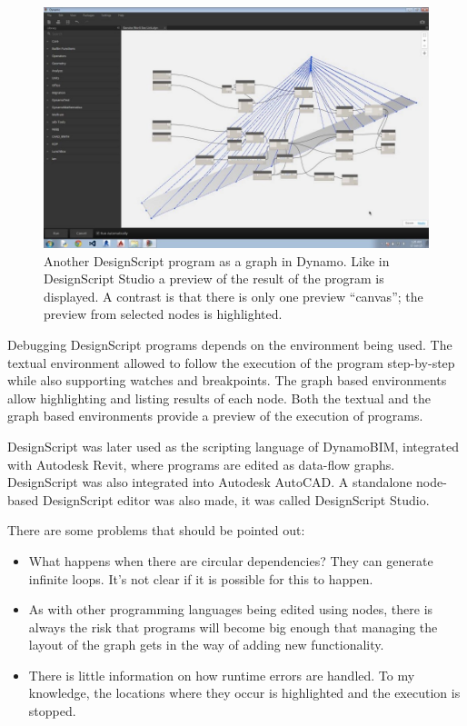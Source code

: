 \documentclass{./llncs2e/llncs}
\begin{document}
	\begin{figure}
		\centering
		\includegraphics[width=1.0\textwidth]{img/ds_dynamo}
		\caption{Another DesignScript program as a graph in Dynamo. Like in DesignScript Studio a preview of the result of the program is displayed. A contrast is that there is only one preview ``canvas''; the preview from selected nodes is highlighted.}
		\label{fig:ds:dynamo}
	\end{figure} 
	
	Debugging DesignScript programs depends on the environment being used. 
	The textual environment allowed to follow the execution of the program step-by-step while also supporting watches and breakpoints. 
	The graph based environments allow highlighting and listing results of each node. 
	Both the textual and the graph based environments provide a preview of the execution of programs.
	
	
	DesignScript was later used as the scripting language of DynamoBIM, integrated with Autodesk Revit, where programs are edited as data-flow graphs. 
	DesignScript was also integrated into Autodesk AutoCAD. 
	A standalone node-based DesignScript editor was also made, it was called DesignScript Studio.
	
	There are some problems that should be pointed out:
	\begin{itemize}
		\item What happens when there are circular dependencies? They can generate infinite loops. 
		It's not clear if it is possible for this to happen.
		\item As with other programming languages being edited using nodes, there is always the risk that programs will become big enough that managing the layout of the graph gets in the way of adding new functionality. 
		\item There is little information on how runtime errors are handled. 
		To my knowledge, the locations where they occur is highlighted and the execution is stopped.
	\end{itemize}
	
\end{document}
